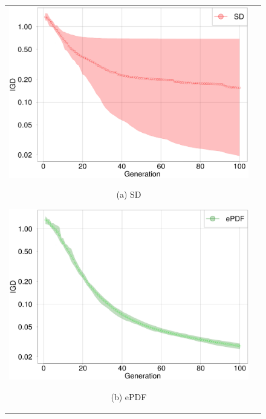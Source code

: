 \documentclass[../main/main]{subfiles}
\begin{document}
\begin{figure}[htbp]
\begin{tabular}{cc}
\begin{minipage}{0.33\hsize}
\includegraphics[width=1\linewidth]{../figures/multidtlz4_sd_minmax.png}
\begin{center}
{\footnotesize (a) SD}
\end{center}
\end{minipage}
\begin{minipage}{0.33\hsize}
\includegraphics[width=1\linewidth]{../figures/multidtlz4_epdf_minmax.png}
\begin{center}
{\footnotesize (b) ePDF}
\end{center}
\end{minipage}
\begin{minipage}{0.33\hsize}

\end{minipage}
\end{tabular}
\end{figure}
\end{document}
